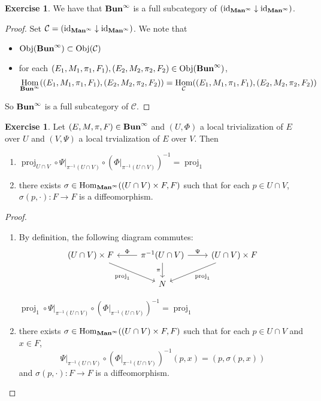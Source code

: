 \documentclass{book}
\theoremstyle{definition}
\newtheorem{ex}[definition]{Exercise}
\newcommand{\sig}{\sigma}
\newcommand{\MC}{\mathcal{C}}
\DeclareMathOperator{\id}{id}
\DeclareMathOperator{\Obj}{Obj}
\DeclareMathOperator{\Hom}{Hom}
\DeclareMathOperator{\prj}{\text{proj}}
\DeclareMathOperator*{\Maninf}{\text{\tbf{Man}}^{\infty}}
\DeclareMathOperator*{\Buninf}{\text{\tbf{Bun}}^{\infty}}
\DeclareMathOperator*{\0}{\mbf{0}}
\DeclareMathOperator*{\1}{\mbf{1}}
\newcommand{\tbf}[1]{\textbf{#1}}
\begin{document}
	\begin{ex}
		We have that $\Buninf$ is a full subcategory of $(\id_{\Maninf} \downarrow \id_{\Maninf})$.
	\end{ex}
	
	\begin{proof} Set $\MC = (\id_{\Maninf} \downarrow \id_{\Maninf})$. We note that 
		\begin{itemize}
			\item $\Obj(\Buninf) \subset \Obj(\MC)$
			\item for each $(E_1, M_1, \pi_1, F_1), (E_2, M_2, \pi_2, F_2) \in \Obj(\Buninf)$, 
			$$\Hom_{\Buninf}((E_1, M_1, \pi_1, F_1), (E_2, M_2, \pi_2, F_2)) = \Hom_{\MC}((E_1, M_1, \pi_1, F_1), (E_2, M_2, \pi_2, F_2))$$
		\end{itemize}
		So $\Buninf$ is a full subcategory of $\MC$.
	\end{proof}


	\begin{ex}
		Let $(E, M, \pi, F) \in \Buninf$ and $(U, \Phi)$ a local trivialization of $E$ over $U$ and $(V, \Psi)$ a local trvialization of $E$ over $V$. Then 
		\begin{enumerate}
			\item $\prj_{U \cap V} \circ \Psi|_{\pi^{-1}(U \cap V)} \circ (\Phi|_{\pi^{-1}(U \cap V)})^{-1} = \prj_1$
			\item there exists $\sig \in \Hom_{\Maninf}(( U \cap V) \times F,  F)$ such that for each $p \in U \cap V$, $\sig(p, \cdot): F \rightarrow F$ is a diffeomorphism.
		\end{enumerate}
	\end{ex}

	\begin{proof}\
		\begin{enumerate}
			\item By definition, the following diagram commutes:
			\[ 
			\begin{tikzcd}
				(U \cap V) \times F  \arrow[dr, "\prj_{1}"'] & \pi^{-1}(U \cap V) \arrow[d, "{\pi}"'] \arrow[l, "{\Phi}"'] \arrow[r, "\Psi"] & (U \cap V) \times F \arrow[dl, "{\prj_1}"]  \\
													                & N
			\end{tikzcd}
			\] 
			
			$\prj_1 \circ \Psi|_{\pi^{-1}(U \cap V)} \circ (\Phi|_{\pi^{-1}(U \cap V)})^{-1} = \prj_1$
			\item there exists $\sig \in \Hom_{\Maninf}(( U \cap V) \times F,  F)$ such that for each $p \in U \cap V$ and $x \in F$, 
			$$\Psi|_{\pi^{-1}(U \cap V)} \circ (\Phi|_{\pi^{-1}(U \cap V)})^{-1}(p, x) = (p, \sig(p, x))$$ 
			and $\sig(p, \cdot): F \rightarrow F$ is a diffeomorphism.
		\end{enumerate}
	\end{proof}
\end{document}
